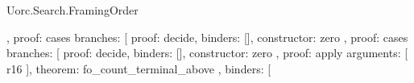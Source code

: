 \begin{lexlean}{Uorc.Search.FramingOrder}
\begin{semanticmodule}
{{{{{{{{{{{{{{{{{{{{{{{{{{{{{                                                                                    },
                                                                                    {
                                                                                      proof: cases{
                                                                                        branches: [
                                                                                          {
                                                                                            proof: decide{},
                                                                                            binders: [],
                                                                                            constructor: zero
                                                                                          },
                                                                                          {
                                                                                            proof: cases{
                                                                                              branches: [
                                                                                                {
                                                                                                  proof: decide{},
                                                                                                  binders: [],
                                                                                                  constructor: zero
                                                                                                },
                                                                                                {
                                                                                                  proof: apply{
                                                                                                    arguments: [
                                                                                                      r16
                                                                                                    ],
                                                                                                    theorem: fo_count_terminal_above
                                                                                                  },
                                                                                                  binders: [
}}}}}}}}}}}}}}}}}}}}}}}}}}}}}}}}}
\end{semanticmodule}
\end{lexlean}

